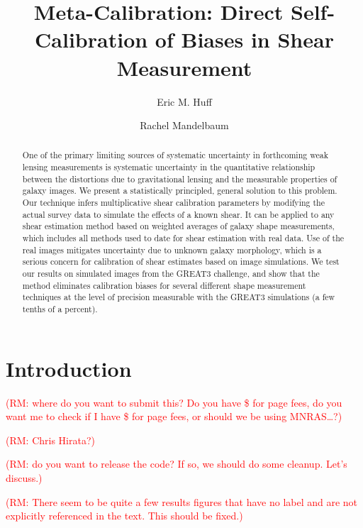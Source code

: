 \documentclass[iop]{emulateapj}
\newcommand\rmcomment[1]{\textcolor{red}{(RM: #1)}}
\begin{document}
\title{Meta-Calibration: Direct Self-Calibration of Biases in Shear Measurement}
\author{Eric M. Huff}
\author{Rachel Mandelbaum}



\begin{abstract}
  One of the primary limiting sources of systematic uncertainty in forthcoming weak lensing
  measurements is systematic uncertainty in the quantitative relationship between the distortions
  due to gravitational lensing and the measurable properties of galaxy images. We present a
  statistically principled, general solution to this problem. Our technique infers multiplicative
  shear calibration parameters by modifying the actual survey data to simulate the effects of a known
  shear. It can be applied to any shear estimation method based on weighted averages of galaxy shape
  measurements, which includes all methods used to date for shear estimation with real data.  Use of
  the real images mitigates uncertainty due to unknown galaxy morphology, which is a serious concern
  for calibration of shear estimates based on image simulations.  We test our results on simulated
  images from the GREAT3 challenge, and show that the method eliminates calibration biases for
  several different shape measurement techniques at the level of precision measurable with the
  GREAT3 simulations (a few tenths of a percent).
\end{abstract}

\section{Introduction}

\rmcomment{where do you want to submit this?  Do you have \$ for page fees, do you want me to check
  if I have \$ for page fees, or should we be using
  MNRAS\dots?}

\rmcomment{Chris  Hirata?}

\rmcomment{do you want to release the code?  If so, we should do some cleanup.  Let's discuss.}

\rmcomment{There seem to be quite a few results figures that have no label and are not explicitly
  referenced in the text.  This should be fixed.}
\end{document}
